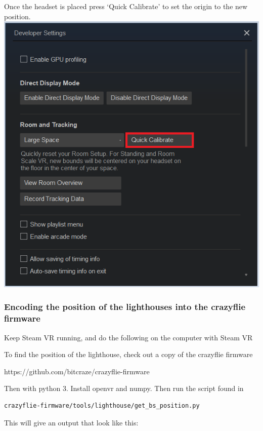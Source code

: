 Once the headset is placed press `Quick Calibrate' to set the origin to
the new position. \includegraphics{images/quickCalibrate.png}

\hypertarget{encoding-the-position-of-the-lighthouses-into-the-crazyflie-firmware}{%
\subsubsection{Encoding the position of the lighthouses into the
crazyflie
firmware}\label{encoding-the-position-of-the-lighthouses-into-the-crazyflie-firmware}}

Keep Steam VR running, and do the following on the computer with Steam
VR

To find the position of the lighthouse, check out a copy of the
crazyflie firmware

https://github.com/bitcraze/crazyflie-firmware

Then with python 3. Install openvr and numpy. Then run the script found
in

\begin{verbatim}
crazyflie-firmware/tools/lighthouse/get_bs_position.py
\end{verbatim}

This will give an output that look like this:

